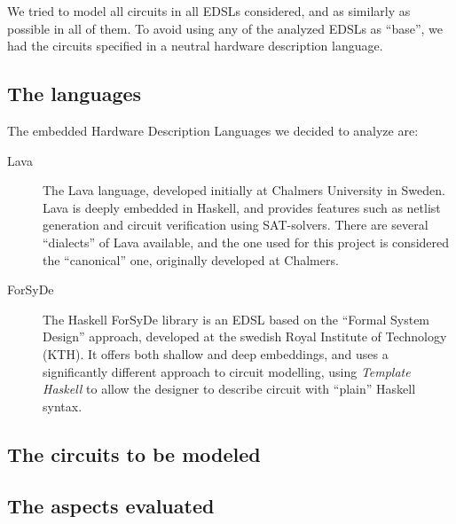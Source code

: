 \documentclass[a4paper]{article}
\begin{document}
        We tried to model all circuits in all EDSLs considered, and as similarly as possible in
        all of them. To avoid using any of the analyzed EDSLs as ``base'', we had the circuits
        specified in a neutral hardware description language.

        \subsection{The languages}
        \label{subsec:languages}
            The embedded Hardware Description Languages we decided to analyze are:
            \begin{description}
                \item[Lava] The Lava language, developed initially at Chalmers University in Sweden.
                    Lava is deeply embedded in Haskell, and provides features such as netlist
                    generation and circuit verification using SAT-solvers. There are several
                    ``dialects'' of Lava available, and the one used for this project is considered
                    the ``canonical'' one, originally developed at Chalmers.

                \item[ForSyDe] The Haskell ForSyDe library is an EDSL based on the ``Formal System
                    Design'' approach, developed at the swedish Royal Institute of Technology (KTH).
                    It offers both shallow and deep embeddings, and uses a significantly different
                    approach to circuit modelling, using \emph{Template Haskell} to allow the
                    designer to describe circuit with ``plain'' Haskell syntax.
            \end{description}

        \subsection{The circuits to be modeled}
        \label{subsec:circuits}

        \subsection{The aspects evaluated}
        \label{subsec:aspects}
\end{document}
